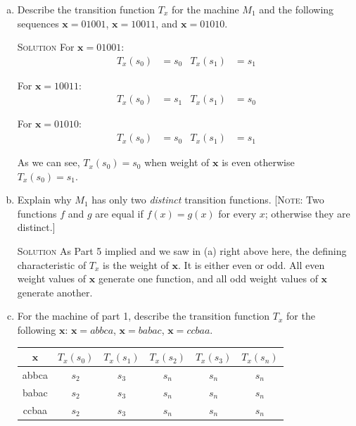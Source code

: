 \documentclass[twoside]{amsart}
\newcommand{\solution}{\textsc{Solution}\xspace}
\begin{document}
\begin{enumerate}[A.]
\begin{enumerate}[1]
      \begin{enumerate}[(a)]
	 \item Describe the transition function $T_x$ for the machine $M_1$ and
	 the following sequences $\mathbf{x}=01001$, $\mathbf{x}=10011$, and
	 $\mathbf{x}=01010$.

	 \noindent \solution 
	 For $\mathbf{x} = 01001$:
	 \begin{align*}
	     T_x(s_0) &= s_0 & T_x(s_1) &= s_1
	 \end{align*}   
	 
	 For $\mathbf{x} = 10011$:
	 \begin{align*}
	     T_x(s_0) &= s_1 & T_x(s_1) &= s_0
	 \end{align*}   

	 For $\mathbf{x} = 01010$:
	 \begin{align*}
	     T_x(s_0) &= s_0 & T_x(s_1) &= s_1
	 \end{align*}   

	 As we can see, $T_x(s_0)=s_0$ when weight of $\mathbf{x}$ is even
	 otherwise $T_x(s_0)=s_1$.

	 \item Explain why $M_1$ has only two \emph{distinct} transition
	 functions. [\textsc{Note}: Two functions $f$ and $g$ are equal
	 if $f(x)=g(x)$ for every $x$; otherwise they are distinct.]
	 
	 \solution As Part 5 implied and we saw in (a) right above here,
	 the defining characteristic of $T_x$ is the weight of $\mathbf{x}$.
	 It is either even or odd. All even weight values of $\mathbf{x}$
	 generate one function, and all odd weight values of $\mathbf{x}$
	 generate another.

	 \item For the machine of part 1, describe the transition function
	 $T_x$ for the following $\mathbf{x}$: $\mathbf{x}=abbca$,
	 $\mathbf{x}=babac$, $\mathbf{x}=ccbaa$.
	 \begin{center}
	 \begin{tabular}{c|ccccc}
	    $\mathbf{x}$ & $T_x(s_0)$ & $T_x(s_1)$ & $T_x(s_2)$ & $T_x(s_3)$
	        & $T_x(s_n)$ \\ \hline
		abbca    & $s_2$ & $s_3$ & $s_n$ & $s_n$ & $s_n$ \\
		babac    & $s_2$ & $s_3$ & $s_n$ & $s_n$ & $s_n$ \\
		ccbaa    & $s_2$ & $s_3$ & $s_n$ & $s_n$ & $s_n$ 
	 \end{tabular}
	 \end{center}


\end{enumerate}
\end{enumerate}
\end{enumerate}
\end{document}
